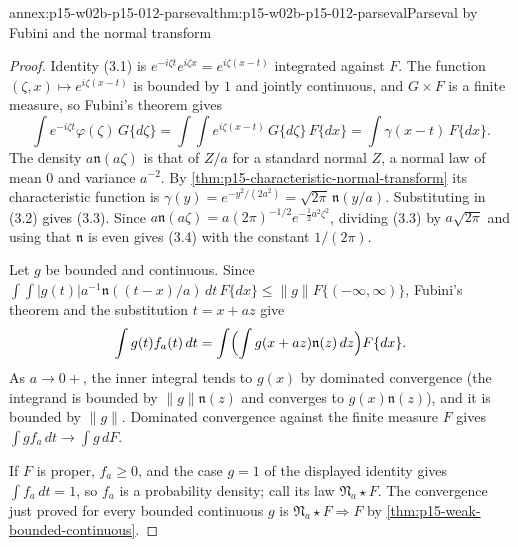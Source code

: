 \begin{annexitem}{annex:p15-w02b-p15-012-parseval}{thm:p15-w02b-p15-012-parseval}{Parseval by Fubini and the normal transform}
\begin{proof}
Identity (3.1) is \(e^{-i\zeta t}e^{i\zeta x}=e^{i\zeta(x-t)}\)
integrated against \(F\). The function \((\zeta,x)\mapsto e^{i\zeta(x-t)}\) is
bounded by \(1\) and jointly continuous, and \(G\times F\) is a finite
measure, so Fubini's theorem gives
\[
 \int e^{-i\zeta t}\varphi(\zeta)\,G\{d\zeta\}
   =\int\!\!\int e^{i\zeta(x-t)}\,G\{d\zeta\}\,F\{dx\}
   =\int\gamma(x-t)\,F\{dx\}.
\]
The density \(a\mathfrak n(a\zeta)\) is that of \(Z/a\) for a standard normal
\(Z\), a normal law of mean \(0\) and variance \(a^{-2}\). By
\cref{thm:p15-characteristic-normal-transform} its characteristic function is
\(\gamma(y)=e^{-y^2/(2a^2)}=\sqrt{2\pi}\,\mathfrak n(y/a)\). Substituting in
(3.2) gives (3.3). Since \(a\mathfrak n(a\zeta)=a(2\pi)^{-1/2}e^{-\frac12a^2\zeta^2}\),
dividing (3.3) by \(a\sqrt{2\pi}\) and using that \(\mathfrak n\) is even gives
(3.4) with the constant \(1/(2\pi)\).

Let \(g\) be bounded and continuous. Since
\(\int\!\int|g(t)|a^{-1}\mathfrak n((t-x)/a)\,dt\,F\{dx\}\leq\|g\|F\{(-\infty,\infty)\}\),
Fubini's theorem and the substitution \(t=x+az\) give
\[
 \int g(t)f_a(t)\,dt=\int\Bigl(\int g(x+az)\mathfrak n(z)\,dz\Bigr)F\{dx\}.
\]
As \(a\to0+\), the inner integral tends to \(g(x)\) by dominated convergence
(the integrand is bounded by \(\|g\|\mathfrak n(z)\) and converges to
\(g(x)\mathfrak n(z)\)), and it is bounded by \(\|g\|\). Dominated convergence
against the finite measure \(F\) gives \(\int g f_a\,dt\to\int g\,dF\).

If \(F\) is proper, \(f_a\geq0\), and the case \(g=1\) of the displayed
identity gives \(\int f_a\,dt=1\), so \(f_a\) is a probability density; call
its law \(\mathfrak N_a\star F\). The convergence just proved for every
bounded continuous \(g\) is \(\mathfrak N_a\star F\Rightarrow F\) by
\cref{thm:p15-weak-bounded-continuous}.
\end{proof}
\end{annexitem}

